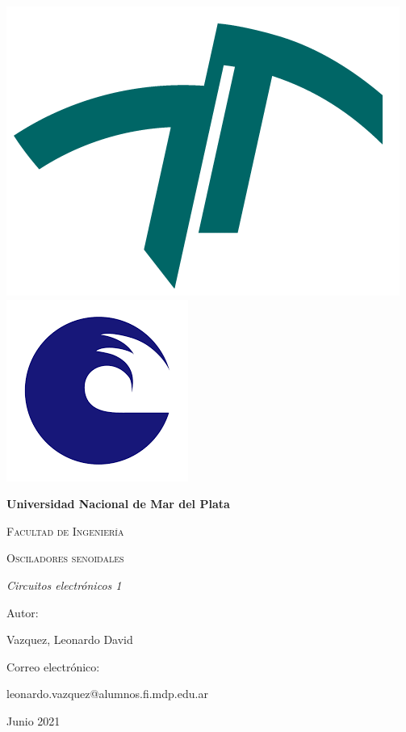 

\raggedright
{\includegraphics[width=0.2\linewidth]{images/facu.png}}
\hspace{10.5cm}
{\includegraphics[width=0.15\linewidth]{images/uni.png}}
\vspace{1cm}


\centering
{\bfseries\LARGE Universidad Nacional de Mar del Plata \par}
\vspace{1cm}
{\scshape\Large Facultad de Ingeniería \par}
\vspace{3cm}

{\scshape\Huge Osciladores senoidales \par}
\vspace{1cm}
{\itshape\Large Circuitos electrónicos 1 \par}
\vfill
{\Large Autor: \par}
{\Large Vazquez, Leonardo David \par}
\vspace{1cm}
{\Large Correo electrónico: \par}
{\Large leonardo.vazquez@alumnos.fi.mdp.edu.ar \par}
\vfill
{\Large Junio 2021 \par}